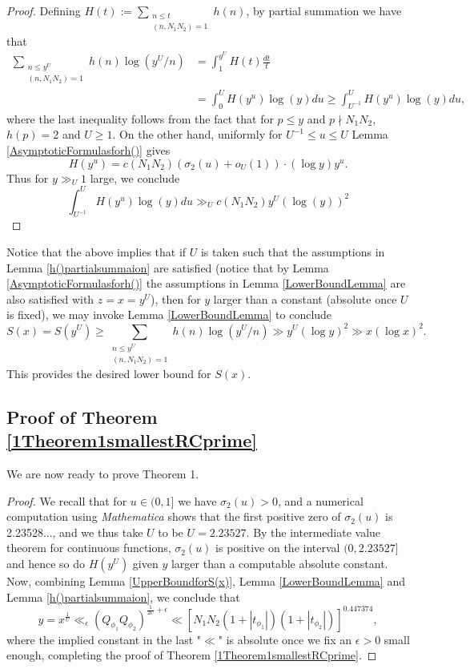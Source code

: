 \documentclass[10pt,leqno]{amsart}
\theoremstyle{plain}
\theoremstyle{definition}
\theoremstyle{remark}
\numberwithin{equation}{section}
\begin{document}
\begin{proof}
    Defining $H(t) := \sum_{\substack{n \leq t \\ (n,N_1N_2)=1}}h(n)$, by partial summation we have that 
    \begin{align*}
        \sum_{\substack{n \leq y^U \\ (n,N_1N_2)=1}}h(n)\log(y^U/n) & = \int^{y^U}_{1}H(t)\frac{dt}{t} \\
        & = \int^{U}_{0}H(y^u)\log(y) du \geq \int^{U}_{U^{-1}}H(y^u)\log (y)du,
    \end{align*}
    where the last inequality follows from the fact that for $p \leq y$ and $p\nmid N_1N_2$, $h(p) =2$
    and $U\geq 1$.
    On the other hand, uniformly for $U^{-1} \leq u \leq U$ Lemma \ref{AsymptoticFormulasforh()} gives
    \[
        H(y^u) = c(N_1N_2)(\sigma_2(u) + o_U(1))\cdot (\log y)y^u.
    \]
    Thus for $y \gg_U 1$ large, we conclude
    \[
        \int^{U}_{U^{-1}}H(y^u)\log (y)du \gg_U c(N_1N_2)y^U(\log (y))^{2}
    \]
\end{proof}

Notice that the above implies that if $U$ is taken such that the assumptions in Lemma \ref{h()partialsummaion} are satisfied (notice that by Lemma \ref{AsymptoticFormulasforh()} the assumptions in Lemma \ref{LowerBoundLemma} are also satisfied with $z = x = y^U$), then for $y$ larger than a constant (absolute once $U$ is fixed), we may invoke Lemma \ref{LowerBoundLemma} to conclude 
\[
    S(x) = S(y^U) \geq \sum_{\substack{n \leq y^U \\ (n,N_1N_2)=1}}h(n)\log(y^U/n) \gg y^U(\log y)^2 \gg x(\log x)^2.
\]
This provides the desired lower bound for $S(x)$.


\subsection{Proof of Theorem \ref{1Theorem1smallestRCprime}}
We are now ready to prove Theorem 1.
\begin{proof}
    We recall that for $u \in (0,1]$ we have $\sigma_2(u) > 0$, and a numerical computation using \textit{Mathematica} shows that the first positive 
zero of $\sigma_2(u)$ is 2.23528..., and we thus take $U$ to be $U = 2.23527$. By the intermediate value theorem for continuous functions, $\sigma_2(u)$ is positive on the interval $(0, 2.23527]$ and hence so do $H(y^U)$ given $y$ larger than a computable absolute constant.
Now, combining Lemma \ref{UpperBoundforS(x)}, Lemma \ref{LowerBoundLemma} and Lemma \ref{h()partialsummaion},
we conclude that 
\[
    y = x^{\frac{1}{U}} \ll_{\epsilon} (Q_{\phi_1}Q_{\phi_2})^{\frac{1}{2U}+\epsilon} \ll [N_1N_2(1 + |t_{\phi_1}|)(1 + |t_{\phi_2}|)]^{0.447374},
\]
where the implied constant in the last "$\ll$" is absolute once we fix an $\epsilon > 0$ small enough, completing the proof of Theorem \ref{1Theorem1smallestRCprime}.    
\end{proof}
\end{document}
